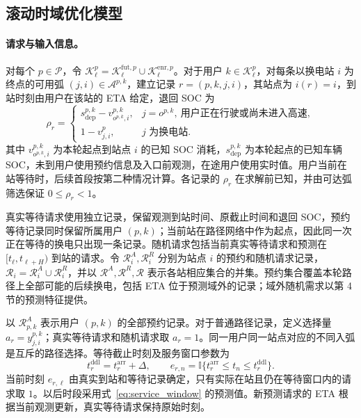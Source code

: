 \documentclass[12pt,a4paper,UTF8]{ctexart}
\numberwithin{equation}{section}
\newcommand{\ind}{\mathbb I}
\newcommand{\R}{\mathcal R}
\begin{document}
\subsection{滚动时域优化模型}
\label{sec:model}

\paragraph{请求与输入信息。}
对每个 $p\in\mathcal P$，令 $\mathcal K_\ell^p=\mathcal K_\ell^{\mathrm{fut},p}\cup\mathcal K_\ell^{\mathrm{enr},p}$。对于用户 $k\in\mathcal K_\ell^p$，对每条以换电站 $i$ 为终点的可用弧 $(j,i)\in\mathcal A^{p,k}$，建立记录 $r=(p,k,j,i)$，其站点为 $i(r)=i$，到站时刻由用户在该站的 ETA 给定，退回 SOC 为
\begin{equation}
\rho_r=
\begin{cases}
s_{\mathrm{dep}}^{p,k}-v_{o^{p,k},i}^{p,k},&j=o^{p,k},\ \text{用户正在行驶或尚未进入高速},\\
1-v_{j,i}^{p},&j\text{ 为换电站}.
\end{cases}
\label{eq:return_soc}
\end{equation}
其中 $v_{o^{p,k},i}^{p,k}$ 为本轮起点到站点 $i$ 的已知 SOC 消耗，$s_{\mathrm{dep}}^{p,k}$ 为本轮起点的已知车辆 SOC，未到用户使用预约信息及入口前观测，在途用户使用实时值。用户当前在站等待时，后续首段按第二种情况计算。各记录的 $\rho_r$ 在求解前已知，并由可达弧筛选保证 $0\le\rho_r<1$。

真实等待请求使用独立记录，保留观测到站时间、原截止时间和退回 SOC，预约等待记录同时保留所属用户 $(p,k)$；当前站在路径网络中作为起点，因此同一次正在等待的换电只出现一条记录。随机请求包括当前真实等待请求和预测在 $[t_\ell,t_{\ell+H})$ 到站的请求。令 $\R_i^A,\R_i^R$ 分别为站点 $i$ 的预约和随机请求记录，$\R_i=\R_i^A\cup\R_i^R$，并以 $\R^A,\R^R,\R$ 表示各站相应集合的并集。预约集合覆盖本轮路径上全部可能的后续换电，包括 ETA 位于预测域外的记录；域外随机需求以第 4 节的预测特征提供。

以 $\R_{p,k}^A$ 表示用户 $(p,k)$ 的全部预约记录。对于普通路径记录，定义选择量 $a_r=y_{j,i}^{p,k}$；真实等待请求和随机请求取 $a_r=1$。同一用户同一站点对应的不同入弧是互斥的路径选择。等待截止时刻及服务窗口参数为
\begin{equation}
t_r^{\mathrm{ddl}}=t_r^{\mathrm{arr}}+\Delta,
\qquad e_{r,n}=\ind\{t_r^{\mathrm{arr}}\le t_n\le t_r^{\mathrm{ddl}}\}.
\label{eq:service_window}
\end{equation}
当前时刻 $e_{r,\ell}$ 由真实到站和等待记录确定，只有实际在站且仍在等待窗口内的请求取 $1$。以后时段采用式~\eqref{eq:service_window} 的预测值。新预测请求的 ETA 根据当前观测更新，真实等待请求保持原始时刻。
\end{document}
